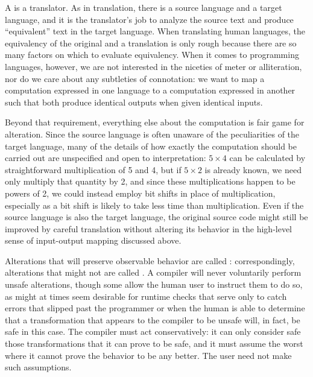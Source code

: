 A  is a translator. As in translation, there is a source language and a target language, and it is the translator's job to analyze the source text and produce ``equivalent'' text in the target language. When translating human languages, the equivalency of the original and a translation is only rough because there are so many factors on which to evaluate equivalency. When it comes to programming languages, however, we are not interested in the niceties of meter or alliteration, nor do we care about any subtleties of connotation: we want to map a computation expressed in one language to a computation expressed in another such that both produce identical outputs when given identical inputs.

Beyond that requirement, everything else about the computation is fair game for alteration. Since the source language is often unaware of the peculiarities of the target language, many of the details of how exactly the computation should be carried out are unspecified and open to interpretation: $5 \times 4$ can be calculated by straightforward multiplication of 5 and 4, but if $5 \times 2$ is already known, we need only multiply that quantity by 2, and since these multiplications happen to be powers of 2, we could instead employ bit shifts in place of multiplication, especially as a bit shift is likely to take less time than multiplication. Even if the source language is also the target language, the original source code might still be improved by careful translation without altering its behavior in the high-level sense of input-output mapping discussed above.

Alterations that will preserve observable behavior are called : correspondingly, alterations that might not are called . A compiler will never voluntarily perform unsafe alterations, though some allow the human user to instruct them to do so, as might at times seem desirable for runtime checks that serve only to catch errors that slipped past the programmer or when the human is able to determine that a transformation that appears to the compiler to be unsafe will, in fact, be safe in this case. The compiler must act conservatively: it can only consider safe those transformations that it can prove to be safe, and it must assume the worst where it cannot prove the behavior to be any better. The user need not make such assumptions.

